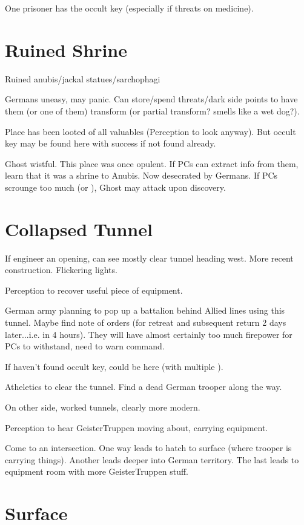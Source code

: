 \documentclass{book}
\newcommand{\df}{\DifficultyDie }
\newcommand{\stb}{\SetbackDie }
\newcommand{\ch}{\ChallengeDie }
\begin{document}
\begin{multicols}{2}
One prisoner has the occult key (especially if threats on medicine).

\section{Ruined Shrine}

Ruined anubis/jackal statues/sarchophagi

Germans uneasy, may panic.  Can store/spend threats/dark side points to have them (or one of them) transform (or partial transform?  smells like a wet dog?).

Place has been looted of all valuables (\ch\df\stb\stb Perception to look anyway).  But occult key may be found here with success if not found already.

Ghost wistful.  This place was once opulent.  If PCs can extract info from them, learn that it was a shrine to Anubis.  Now desecrated by Germans.  If PCs scrounge too much (\Threat\Threat\Threat or \Despair), Ghost may attack upon discovery.


\section{Collapsed Tunnel}

If engineer an opening, can see mostly clear tunnel heading west.  More recent construction.  Flickering lights.

\df\df Perception to recover useful piece of equipment.

German army planning to pop up a battalion behind Allied lines using this tunnel.  Maybe find note of orders (for retreat and subsequent return 2 days later...i.e. in 4 hours).  They will have almost certainly too much firepower for PCs to withstand, need to warn command.

If haven't found occult key, could be here (with multiple \Advantage).

\df\df\df Atheletics to clear the tunnel.  Find a dead German trooper along the way.  

On other side, worked tunnels, clearly more modern.

\df\df Perception to hear GeisterTruppen moving about, carrying equipment.

Come to an intersection.  One way leads to hatch to surface (where trooper is carrying things).  Another leads deeper into German territory.  The last leads to equipment room with more GeisterTruppen stuff.

\section{Surface}


\end{multicols}
\end{document}
